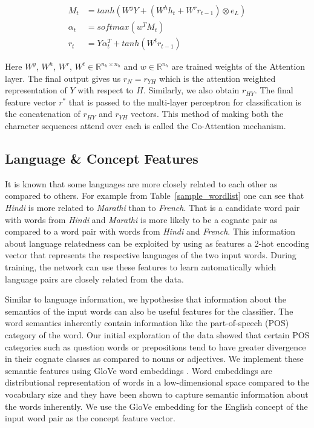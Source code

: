 \documentclass[11pt,letterpaper]{article}
\begin{document}
\begin{align}
M_t &= tanh(W^yY + (W^hh_t + W^rr_{t-1})\otimes e_L) \\
\alpha_t &= softmax(w^TM_t) \\
r_t &= Y\alpha_t^T + tanh(W^tr_{t-1})
\end{align}

Here $W^y$, $W^h$, $W^r$, $W^t \in  \mathbb{R}^{n_h \times n_h}$ and $w \in \mathbb{R}^{n_h}$ are trained weights of the Attention layer. The final output gives us $r_N = r_{YH}$ which is the attention weighted representation of $Y$ with respect to $H$. Similarly, we also obtain $r_{HY}$. The final feature vector $r^*$ that is passed to the multi-layer perceptron for classification is the concatenation of $r_{HY}$ and $r_{YH}$ vectors. This method of making both the character sequences attend over each is called the Co-Attention mechanism.
 
\subsection{Language \& Concept Features}

It is known that some languages are more closely related to each other as compared to others. For example from Table~\ref{sample_wordlist} one can see that \textit{Hindi} is more related to \textit{Marathi} than to \textit{French}. That is a candidate word pair with words from \textit{Hindi} and \textit{Marathi} is more likely to be a cognate pair as compared to a word pair with words from \textit{Hindi} and \textit{French}. This information about language relatedness can be exploited by using as features a 2-hot encoding vector that represents the respective languages of the two input words. During training, the network can use these features to learn automatically which language pairs are closely related from the data.

Similar to language information, we hypothesise that information about the semantics of the input words can also be useful features for the classifier. The word semantics inherently contain information like the part-of-speech (POS) category of the word. Our initial exploration of the data showed that certain POS categories such as question words or prepositions tend to have greater divergence in their cognate classes as compared to nouns or adjectives. We implement these semantic features using GloVe word embeddings \cite{pennington2014glove}. Word embeddings are distributional representation of words in a low-dimensional space compared to the vocabulary size and they have been shown to capture semantic information about the words inherently. We use the GloVe embedding for the English concept of the input word pair as the concept feature vector.
\end{document}
